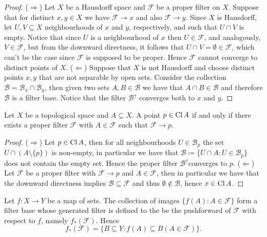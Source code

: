 \begin{proof}
    (\(\Rightarrow\)) Let \(X\) be a Hausdorff space and \(\mathcal F\) be a
    proper filter on \(X\). Suppose that for distinct \(x, y \in X\) we have
    \(\mathcal F \to x\) and also \(\mathcal F \to y\). Since \(X\) is Hausdorff,
    let \(U, V \subseteq X\) neighbourhoods of \(x\) and \(y\), respectively, and
    such that \(U \cap V\) is empty. Notice that since \(U\) is a neighbourhood of
    \(x\) then \(U \in \mathcal F\), and analogously, \(V \in \mathcal F\), but
    from the downward directness, it follows that \(U \cap V = \emptyset \in
    \mathcal F\), which can't be the case since \(\mathcal F\) is supposed to be
    proper. Hence \(\mathcal F\) cannot converge to distinct points of \(X\).
    (\(\Leftarrow\)) Suppose that \(X\) is not Hausdorff and choose distinct
    points \(x, y\) that are not separable by open sets. Consider the collection
    \(\mathcal B = \mathcal B_x \cap \mathcal B_y\), then given two sets \(A, B
    \in \mathcal B\) we have that \(A \cap B \in \mathcal B\) and therefore
    \(\mathcal B\) is a filter base. Notice that the filter \(\mathcal B^\uparrow\)
    converges both to \(x\) and \(y\).
\end{proof}

\begin{proposition}[Closed]\label{prop: closed from filter}
    Let \(X\) be a topological space and \(A \subseteq X\). A point \(p \in
    \operatorname{Cl} A\) if and only if there exists a proper filter \(\mathcal F\) with
    \(A \in \mathcal F\) such that \(\mathcal F \to p\).
\end{proposition}

\begin{proof}
    (\(\Rightarrow\)) Let \(p \in \operatorname{Cl} A\), then for all neighbourhoods \(U
    \in \mathcal B_p\) the set \(U \cap (A \setminus \{p\})\) is non-empty, in
    particular we have that \(\mathcal B \coloneq \{U \cap A \colon U \in \mathcal B_p\}\)
    does not contain the empty set. Hence the proper filter \(\mathcal
    B^\uparrow\)converges to \(p\). (\(\Leftarrow\)) Let \(\mathcal F\) be a
    proper filter with \(\mathcal F \to p\) and \(A \in \mathcal F\), then in
    particular we have that the downward directness implies \(\mathcal B \subseteq
    \mathcal F\) and thus \(\emptyset \not\in \mathcal B\), hence \(x \in
    \operatorname{Cl} A\).
\end{proof}

\begin{definition}\label{def: pushforward of filters}
    Let \(f: X \to Y\) be a map of sets. The collection of images \(\{f(A) \colon A \in
    \mathcal F\}\) form a filter base whose generated filter is defined to the be
    the pushforward of \(\mathcal F\) with respect to \(f\), namely
    \(f_\ast(\mathcal F)\). Hence
    \[
        f_\ast(\mathcal F) = \{B \subseteq Y \colon f(A) \subseteq B (A \in \mathcal
        F)\}.
    \]
\end{definition}


